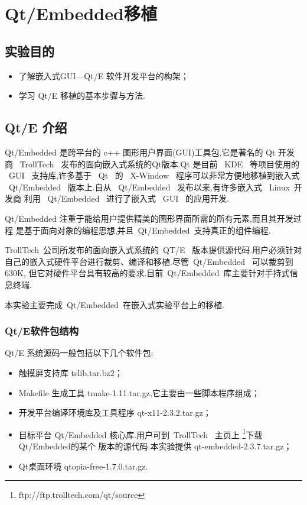 \chapter{Qt/Embedded移植}

\section{实验目的}
\begin{itemize}\itemsep=-3pt
  \item 了解嵌入式GUI---Qt/E 软件开发平台的构架；
  \item 学习 Qt/E 移植的基本步骤与方法.
\end{itemize}

\section{Qt/E 介绍}
	Qt/Embedded 是跨平台的 c++ 图形用户界面(GUI)工具包,它是著名的 Qt 开发商
~TrollTech~ 发布的面向嵌入式系统的Qt版本.Qt 是目前 ~KDE~ 等项目使用的 ~GUI~
支持库,许多基于 ~Qt~ 的 ~X-Window~ 程序可以非常方便地移植到嵌入式
~Qt/Embedded~ 版本上.自从 ~Qt/Embedded~ 发布以来,有许多嵌入式 ~Linux~开发商
利用 ~Qt/Embedded~ 进行了嵌入式 ~GUI~ 的应用开发.

	Qt/Embedded 注重于能给用户提供精美的图形界面所需的所有元素,而且其开发过程
是基于面向对象的编程思想,并且~Qt/Embedded~支持真正的组件编程.

	TrollTech~公司所发布的面向嵌入式系统的~QT/E~ 版本提供源代码.用户必须针对
自己的嵌入式硬件平台进行裁剪、编译和移植.尽管~Qt/Embedded~ 可以裁剪到630K,
但它对硬件平台具有较高的要求.目前~Qt/Embedded~库主要针对手持式信息终端.

	本实验主要完成~Qt/Embedded~在嵌入式实验平台上的移植.
\subsection{Qt/E软件包结构}
	Qt/E 系统源码一般包括以下几个软件包:
\begin{itemize}\itemsep=-3pt
  \item 触摸屏支持库 tslib.tar.bz2；
  \item Makefile 生成工具 tmake-1.11.tar.gz,它主要由一些脚本程序组成；
  \item 开发平台编译环境库及工具程序 qt-x11-2.3.2.tar.gz；
  \item 目标平台 Qt/Embedded 核心库.用户可到~TrollTech~ 主页上
		\footnote{ftp://ftp.trolltech.com/qt/source}下载Qt/Embedded的某个
		版本的源代码.本实验提供 qt-embedded-2.3.7.tar.gz；
  \item Qt桌面环境 qtopia-free-1.7.0.tar.gz.
\end{itemize}

